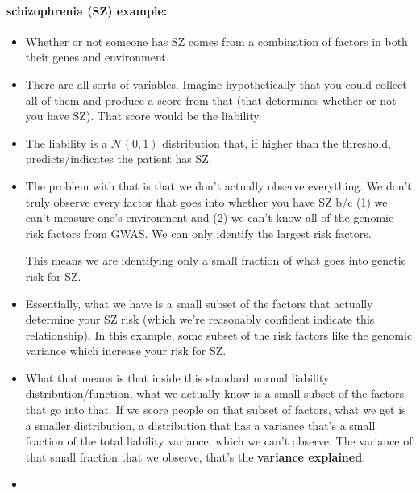 \paragraph*{schizophrenia (SZ) example:}
\begin{itemize}
\item
	Whether or not someone has SZ comes from a combination of factors in both their genes and environment.
\item
	There are all sorts of variables. Imagine hypothetically that you could collect all of them and produce a score from that (that determines whether or not you have SZ). That score would be the liability.
\item
	The liability is a $\mathcal{N}(0,1)$ distribution that, if higher than the threshold, predicts/indicates the patient has SZ.
\item
	The problem with that is that we don't actually observe everything. We don't truly observe every factor that goes into whether you have SZ b/c (1) we can't measure one's environment and (2) we can't know all of the genomic risk factors from GWAS. We can only identify the largest risk factors.

	This means we are identifying only a small fraction of what goes into genetic risk for SZ.
\item
	Essentially, what we have is a small subset of the factors that actually determine your SZ risk (which we're reasonably confident indicate this relationship). In this example, some subset of the risk factors  like the genomic variance which increase your risk for SZ.
\item
	What that means is that inside this standard normal liability distribution/function, what we actually know is a small subset of the factors that go into that. If we score people on that subset of factors, what we get is a smaller distribution, a distribution that has a variance that's a small fraction of the total liability variance, which we can't observe. The variance of that small fraction that we observe, that's the \textbf{variance explained}.
\item

\end{itemize}
